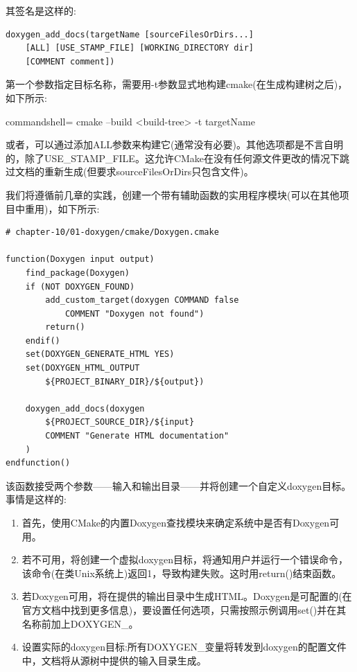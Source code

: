 其签名是这样的:

\begin{lstlisting}[style=styleCMake]
doxygen_add_docs(targetName [sourceFilesOrDirs...]
	[ALL] [USE_STAMP_FILE] [WORKING_DIRECTORY dir]
	[COMMENT comment])
\end{lstlisting}

第一个参数指定目标名称，需要用-t参数显式地构建cmake(在生成构建树之后)，如下所示:

\begin{tcblisting}{commandshell={}}
cmake --build <build-tree> -t targetName
\end{tcblisting}

或者，可以通过添加ALL参数来构建它(通常没有必要)。其他选项都是不言自明的，除了USE\_STAMP\_FILE。这允许CMake在没有任何源文件更改的情况下跳过文档的重新生成(但要求sourceFilesOrDirs只包含文件)。

我们将遵循前几章的实践，创建一个带有辅助函数的实用程序模块(可以在其他项目中重用)，如下所示:

\begin{lstlisting}[style=styleCMake]
# chapter-10/01-doxygen/cmake/Doxygen.cmake

function(Doxygen input output)
	find_package(Doxygen)
	if (NOT DOXYGEN_FOUND)
		add_custom_target(doxygen COMMAND false
			COMMENT "Doxygen not found")
		return()
	endif()
	set(DOXYGEN_GENERATE_HTML YES)
	set(DOXYGEN_HTML_OUTPUT
		${PROJECT_BINARY_DIR}/${output})
		
	doxygen_add_docs(doxygen
		${PROJECT_SOURCE_DIR}/${input}
		COMMENT "Generate HTML documentation"
	)
endfunction()
\end{lstlisting}

该函数接受两个参数——输入和输出目录——并将创建一个自定义doxygen目标。事情是这样的:

\begin{enumerate}
\item 
首先，使用CMake的内置Doxygen查找模块来确定系统中是否有Doxygen可用。

\item 
若不可用，将创建一个虚拟doxygen目标，将通知用户并运行一个错误命令，该命令(在类Unix系统上)返回1，导致构建失败。这时用return()结束函数。

\item 
若Doxygen可用，将在提供的输出目录中生成HTML。Doxygen是可配置的(在官方文档中找到更多信息)，要设置任何选项，只需按照示例调用set()并在其名称前加上DOXYGEN\_。

\item 
设置实际的doxygen目标:所有DOXYGEN\_变量将转发到doxygen的配置文件中，文档将从源树中提供的输入目录生成。
\end{enumerate}

